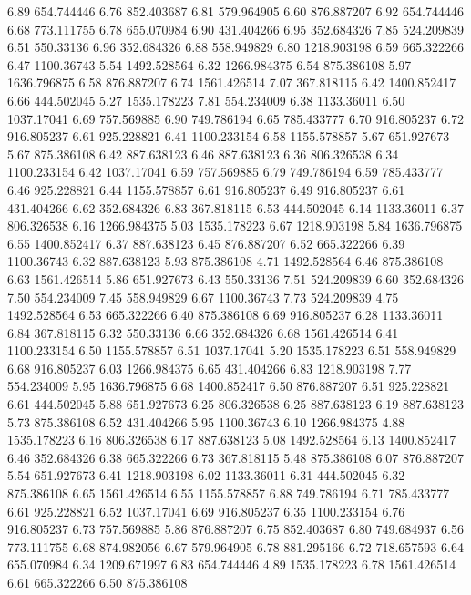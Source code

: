 6.89 	654.744446
6.76 	852.403687
6.81 	579.964905
6.60 	876.887207
6.92 	654.744446
6.68 	773.111755
6.78 	655.070984
6.90 	431.404266
6.95 	352.684326
7.85 	524.209839
6.51 	550.33136
6.96 	352.684326
6.88 	558.949829
6.80 	1218.903198
6.59 	665.322266
6.47 	1100.36743
5.54 	1492.528564
6.32 	1266.984375
6.54 	875.386108
5.97 	1636.796875
6.58 	876.887207
6.74 	1561.426514
7.07 	367.818115
6.42 	1400.852417
6.66 	444.502045
5.27 	1535.178223
7.81 	554.234009
6.38 	1133.36011
6.50 	1037.17041
6.69 	757.569885
6.90 	749.786194
6.65 	785.433777
6.70 	916.805237
6.72 	916.805237
6.61 	925.228821
6.41 	1100.233154
6.58 	1155.578857
5.67 	651.927673
5.67 	875.386108
6.42 	887.638123
6.46 	887.638123
6.36 	806.326538
6.34 	1100.233154
6.42 	1037.17041
6.59 	757.569885
6.79 	749.786194
6.59 	785.433777
6.46 	925.228821
6.44 	1155.578857
6.61 	916.805237
6.49 	916.805237
6.61 	431.404266
6.62 	352.684326
6.83 	367.818115
6.53 	444.502045
6.14 	1133.36011
6.37 	806.326538
6.16 	1266.984375
5.03 	1535.178223
6.67 	1218.903198
5.84 	1636.796875
6.55 	1400.852417
6.37 	887.638123
6.45 	876.887207
6.52 	665.322266
6.39 	1100.36743
6.32 	887.638123
5.93 	875.386108
4.71 	1492.528564
6.46 	875.386108
6.63 	1561.426514
5.86 	651.927673
6.43 	550.33136
7.51 	524.209839
6.60 	352.684326
7.50 	554.234009
7.45 	558.949829
6.67 	1100.36743
7.73 	524.209839
4.75 	1492.528564
6.53 	665.322266
6.40 	875.386108
6.69 	916.805237
6.28 	1133.36011
6.84 	367.818115
6.32 	550.33136
6.66 	352.684326
6.68 	1561.426514
6.41 	1100.233154
6.50 	1155.578857
6.51 	1037.17041
5.20 	1535.178223
6.51 	558.949829
6.68 	916.805237
6.03 	1266.984375
6.65 	431.404266
6.83 	1218.903198
7.77 	554.234009
5.95 	1636.796875
6.68 	1400.852417
6.50 	876.887207
6.51 	925.228821
6.61 	444.502045
5.88 	651.927673
6.25 	806.326538
6.25 	887.638123
6.19 	887.638123
5.73 	875.386108
6.52 	431.404266
5.95 	1100.36743
6.10 	1266.984375
4.88 	1535.178223
6.16 	806.326538
6.17 	887.638123
5.08 	1492.528564
6.13 	1400.852417
6.46 	352.684326
6.38 	665.322266
6.73 	367.818115
5.48 	875.386108
6.07 	876.887207
5.54 	651.927673
6.41 	1218.903198
6.02 	1133.36011
6.31 	444.502045
6.32 	875.386108
6.65 	1561.426514
6.55 	1155.578857
6.88 	749.786194
6.71 	785.433777
6.61 	925.228821
6.52 	1037.17041
6.69 	916.805237
6.35 	1100.233154
6.76 	916.805237
6.73 	757.569885
5.86 	876.887207
6.75 	852.403687
6.80 	749.684937
6.56 	773.111755
6.68 	874.982056
6.67 	579.964905
6.78 	881.295166
6.72 	718.657593
6.64 	655.070984
6.34 	1209.671997
6.83 	654.744446
4.89 	1535.178223
6.78 	1561.426514
6.61 	665.322266
6.50 	875.386108
